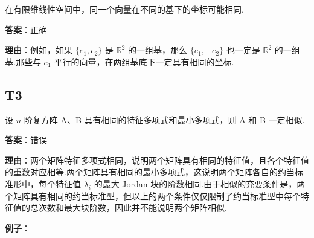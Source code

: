 \documentclass{article}
\begin{document}
\par 在有限维线性空间中，同一个向量在不同的基下的坐标可能相同.

\par \textbf{答案}：正确

\par \textbf{理由}：例如，如果 $\{e_1, e_2\}$ 是 $\mathbb R^2$ 的一组基，那么 \(\{e_1, -e_2\}\) 也一定是 $\mathbb R^2$ 的一组基.那些与 $e_1$ 平行的向量，在两组基底下一定具有相同的坐标.

\subsection{T3}

\par 设 $n$ 阶复方阵 A、B 具有相同的特征多项式和最小多项式，则 A 和 B 一定相似.

\par \textbf{答案}：错误

\par \textbf{理由}：两个矩阵特征多项式相同，说明两个矩阵具有相同的特征值，且各个特征值的重数对应相等.两个矩阵具有相同的最小多项式，这说明两个矩阵各自的约当标准形中，每个特征值 $\lambda_i$ 的最大 Jordan 块的阶数相同.由于相似的充要条件是，两个矩阵具有相同的约当标准型，但以上的两个条件仅仅限制了约当标准型中每个特征值的总次数和最大块阶数，因此并不能说明两个矩阵相似.

\par \textbf{例子}：
\end{document}
